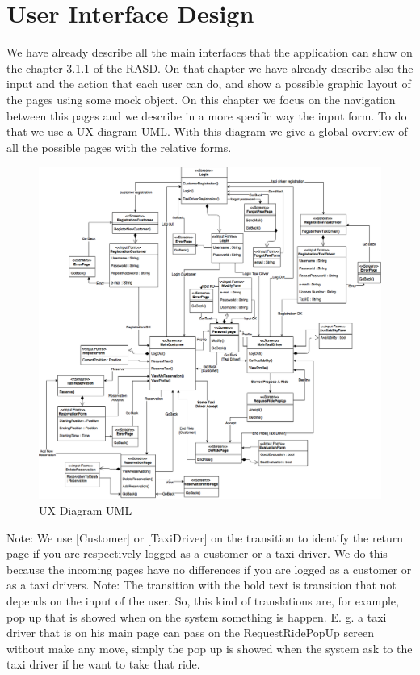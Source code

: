 \documentclass[../../dd.tex]{subfiles}
\begin{document}
	\chapter{User Interface Design}

	We have already describe all the main interfaces that the application can show on the chapter 3.1.1 of the RASD. On that chapter we have already describe also the input and the action that each user can do, and show a possible graphic layout of the pages using some mock object. On this chapter we focus on the navigation between this pages and we describe in a more specific way the input form. To do that we use a UX diagram UML. With this diagram we give a global overview of all the possible pages with the relative forms. 
	
	\begin{figure}[H]
				\centering
				\includegraphics[width=\textwidth, scale=0.5]{../images/UserInterfaces.png}
			\caption{UX Diagram UML}\label{fig:UXDiagram}
		\end{figure}
		
Note: We use [Customer] or [TaxiDriver] on the transition to identify the return page if you are respectively logged as a customer or a taxi driver. We do this because the incoming pages have no differences if you are logged as a customer or as a taxi drivers.
Note: The transition with the bold text is transition that not depends on the input of the user. So, this kind of translations are, for example, pop up that is showed when on the system something is happen. E. g. a taxi driver that is on his main page can pass on the RequestRidePopUp screen without make any move, simply the pop up is showed when the system ask to the taxi driver if he want to take that ride.
\end{document}
